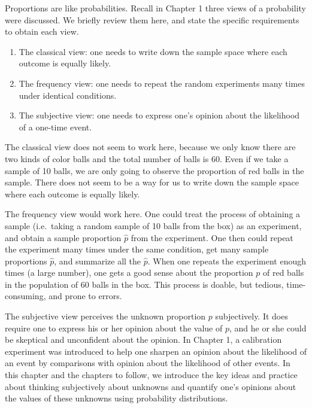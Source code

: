 \documentclass[]{book}
\begin{document}
Proportions are like probabilities. Recall in Chapter 1 three views of a probability were discussed. We briefly review them here, and state the specific requirements to obtain each view.

\begin{enumerate}
\def\labelenumi{\arabic{enumi}.}
\item
  The classical view: one needs to write down the sample space where each outcome is equally likely.
\item
  The frequency view: one needs to repeat the random experiments many times under identical conditions.
\item
  The subjective view: one needs to express one's opinion about the likelihood of a one-time event.
\end{enumerate}

The classical view does not seem to work here, because we only know there are two kinds of color balls and the total number of balls is 60. Even if we take a sample of 10 balls, we are only going to observe the proportion of red balls in the sample. There does not seem to be a way for us to write down the sample space where each outcome is equally likely.

The frequency view would work here. One could treat the process of obtaining a sample (i.e.~taking a random sample of 10 balls from the box) as an experiment, and obtain a sample proportion \(\hat{p}\) from the experiment. One then could repeat the experiment many times under the same condition, get many sample proportions \(\hat{p}\), and summarize all the \(\hat{p}\). When one repeats the experiment enough times (a large number), one gets a good sense about the proportion \(p\) of red balls in the population of 60 balls in the box. This process is doable, but tedious, time-consuming, and prone to errors.

The subjective view perceives the unknown proportion \(p\) subjectively. It does require one to express his or her opinion about the value of \(p\), and he or she could be skeptical and unconfident about the opinion. In Chapter 1, a calibration experiment was introduced to help one sharpen an opinion about the likelihood of an event by comparisons with opinion about the likelihood of other events. In this chapter and the chapters to follow, we introduce the key ideas and practice about thinking subjectively about unknowns and quantify one's opinions about the values of these unknowns using probability distributions.
\end{document}

